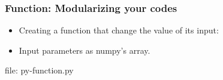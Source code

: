 
\begin{frame}[fragile]
\frametitle{Function: Modularizing your codes}
\newcommand{\newfilename}{py-function.py}
\begin{itemize}
\item Creating a function that change the value of its input: 



\item Input parameters as numpy's array.



\end{itemize}

file: \newfilename
\end{frame}

